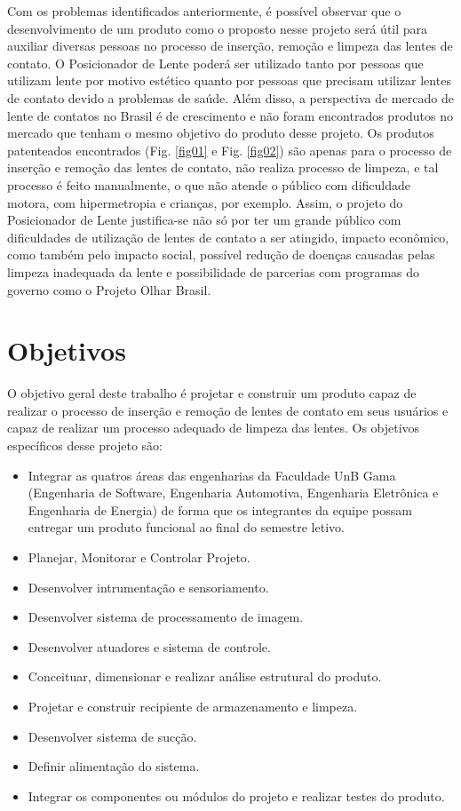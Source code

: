Com os problemas identificados anteriormente, é possível observar que o desenvolvimento de um produto como o proposto nesse projeto será útil para auxiliar diversas pessoas no processo de inserção, remoção e limpeza das lentes de contato. O Posicionador de Lente poderá ser utilizado tanto por pessoas que utilizam lente por motivo estético quanto por pessoas que precisam utilizar lentes de contato devido a problemas de saúde. Além disso, a perspectiva de mercado de lente de contatos no Brasil é de crescimento e não foram encontrados produtos no mercado que tenham o mesmo objetivo do produto desse projeto. Os produtos patenteados encontrados (Fig. \ref{fig01} e Fig. \ref{fig02}) são apenas para o processo de inserção e remoção das lentes de contato, não realiza processo de limpeza, e tal processo é feito manualmente, o que não atende o público com dificuldade motora, com hipermetropia e crianças, por exemplo. Assim, o projeto do Posicionador de Lente justifica-se não só por ter um grande público com dificuldades de utilização de lentes de contato a ser atingido, impacto econômico, como também pelo impacto social, possível redução de doenças causadas pelas limpeza inadequada da lente e possibilidade de parcerias com programas do governo como o Projeto Olhar Brasil.

\section[Objetivos]{Objetivos}

O objetivo geral deste trabalho é projetar e construir um produto capaz de realizar o processo de inserção e remoção de lentes de contato em seus usuários e capaz de realizar um processo adequado de limpeza das lentes. Os objetivos específicos desse projeto são:

\begin{itemize}
\item Integrar as quatros áreas das engenharias da Faculdade UnB Gama (Engenharia de Software, Engenharia Automotiva, Engenharia Eletrônica e Engenharia de Energia) de forma que os integrantes da equipe possam entregar um produto funcional ao final do semestre letivo.
\item Planejar, Monitorar e Controlar Projeto.
\item Desenvolver intrumentação e sensoriamento.
\item Desenvolver sistema de processamento de imagem.
\item Desenvolver atuadores e sistema de controle.
\item Conceituar, dimensionar e realizar análise estrutural do produto.
\item Projetar e construir recipiente de armazenamento e limpeza.
\item Desenvolver sistema de sucção.
\item Definir alimentação do sistema.
\item  Integrar os componentes ou módulos do projeto e realizar testes do produto.
\end{itemize}

